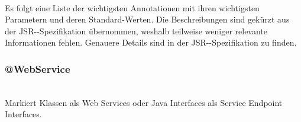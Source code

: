 \documentclass[runningheads]{llncs}
\begin{document}
    \paragraph{}
    Es folgt eine Liste der wichtigsten Annotationen mit ihren wichtigsten Pa\-ra\-me\-tern und
    deren Stan\-dard-\linebreak[0]Wer\-ten. Die Beschreibungen sind gekürzt aus der
    JSR--\linebreak[0]Spe\-zi\-fi\-ka\-tion\cite{jsr_181} übernommen, weshalb
    teilweise weniger relevante Informationen fehlen. Genauere Details sind in der
    JSR--\linebreak[0]Spe\-zi\-fi\-ka\-tion\cite{jsr_181} zu finden.\\ \vfill

    \subsubsection{@WebService}\ \\
      Markiert Klassen als Web Services oder Java Interfaces als Service Endpoint Interfaces.
\end{document}
